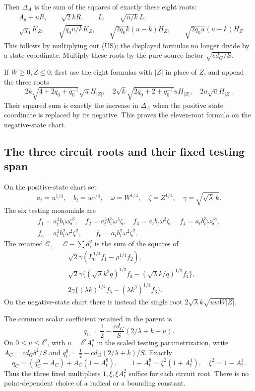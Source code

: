 Then $\Delta_A$ is the sum of the squares of exactly these eight roots:
\begin{align*}
 &A_\theta+uR,\qquad\sqrt2kR,\qquad
 L,\qquad\sqrt{u/k}\,L,\\
 &\sqrt{q_0}K_Z,\qquad\sqrt{q_0u/k}K_Z,
 \qquad\sqrt{2q_0k}(u-k)H_Z,
 \qquad\sqrt{2q_0u}(u-k)H_Z.
\end{align*}
This follows by multiplying out (US);
the displayed formulas no longer divide by a state coordinate.
Multiply these roots by the pure-source factor $\sqrt{cd_G/S}$.

If $W\ge0,Z\le0$, first use the eight formulas with $|Z|$ in place
of $Z$, and append the three roots
\[
 2k\sqrt{4+2q_0+q_0^{-1}}\sqrt u H_{|Z|},\quad
 2\sqrt k\sqrt{2q_0+2+q_0^{-1}}uH_{|Z|},\quad
 2u\sqrt u H_{|Z|}.
\]
Their squared sum is exactly the increase in $\Delta_A$ when the
positive state coordinate is replaced by its negative. This proves
the eleven-root formula on the negative-state chart.

\subsection{The three circuit roots and their fixed testing span}

On the positive-state chart set
\[
 a_t=u^{1/4},\quad b_t=w^{1/4},\quad
 \omega=W^{1/4},\quad\zeta=Z^{1/4},\quad
 \gamma=\sqrt{\sqrt\lambda\,k}.
\]
The six testing monomials are
\[
\begin{gathered}
 f_1=a_t^3b_t\omega\zeta^3,\quad
 f_2=a_t^3b_t^3\omega^3\zeta,\quad
 f_3=a_tb_t\omega^3\zeta,\quad
 f_4=a_tb_t^3\omega\zeta^3,\\
 f_5=a_t^3b_t^2\omega^2\zeta^2,\qquad
 f_6=a_tb_t^2\omega^2\zeta^2.
\end{gathered}
\]
The retained $\mathscr C_+=\mathscr C-\sum d_i^2$ is the sum of
the squares of
\begin{align*}
 &\sqrt2\gamma(L_0^{1/4}f_1-\rho^{1/4}f_2),\\
 &\sqrt2\gamma\{(\sqrt\lambda k^2q)^{1/2}f_3
                    -(\sqrt\lambda k/q)^{1/2}f_4\},\\
 &2\gamma\{(\lambda k)^{1/4}f_5-(\lambda k^3)^{1/4}f_6\}.
\end{align*}
On the negative-state chart there is instead the single root
$2\sqrt\lambda k\sqrt{uwW|Z|}$.

The common scalar coefficient retained in the parent is
\[
 q_C=\frac12-\frac{cd_G}{S}(2/\lambda+k+u).
\]
On $0\le u\le\delta^2$, with $u=\delta^2A_t^8$ in the scaled
testing parametrization, write $A_C=cd_G\delta^2/S$ and
$q_C^0=\frac12-cd_G(2/\lambda+k)/S$. Exactly
\[
 q_C=(q_C^0-A_C)+A_C(1-A_t^8),\qquad
 1-A_t^8=\xi^2(1+A_t^4),\quad\xi^2=1-A_t^4.
\]
Thus the three fixed multipliers $1,\xi,\xi A_t^2$ suffice for
each circuit root. There is no point-dependent choice of a radical
or a bounding constant.


